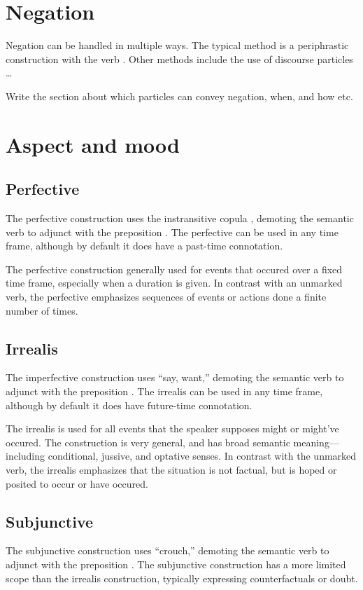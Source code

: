 \section{Negation}
Negation can be handled in multiple ways. The typical method is a periphrastic construction with the verb . Other methods include the use of discourse particles \dots

\begin{kaobox}[frametitle=\sc todo:]
	Write the section about which particles can convey negation, when, and how etc.
\end{kaobox}

\section{Aspect and mood}
\subsection{Perfective}
The perfective construction uses the instransitive copula , demoting the semantic verb to adjunct with the preposition . The perfective can be used in any time frame, although by default it does have a past-time connotation.

The perfective construction generally used for events that occured over a fixed time frame, especially when a duration is given. In contrast with an unmarked verb, the perfective emphasizes sequences of events or actions done a finite number of times.

\subsection{Irrealis}
The imperfective construction uses  “say, want,” demoting the semantic verb to adjunct with the preposition . The irrealis can be used in any time frame, although by default it does have future-time connotation.

The irrealis is used for all events that the speaker supposes might or might've occured. The construction is very general, and has broad semantic meaning---including conditional, jussive, and optative senses. In contrast with the unmarked verb, the irrealis emphasizes that the situation is not factual, but is hoped or posited to occur or have occured.

\subsection{Subjunctive}
The subjunctive construction uses  “crouch,” demoting the semantic verb to adjunct with the preposition . The subjunctive construction has a more limited scope than the  irrealis construction, typically expressing counterfactuals or doubt.